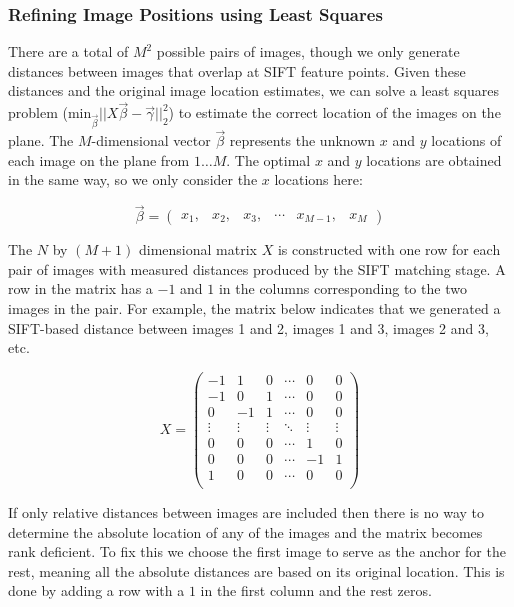 \documentclass[10pt,twocolumn,letterpaper]{article}
\begin{document}
\subsubsection{Refining Image Positions using Least Squares}
\label{sec:refiningImagePositions}
There are a total of $M^{2}$ possible pairs of images, though we only
generate distances between images that overlap at SIFT feature
points. Given these distances and the original image location
estimates, we can solve a least squares problem
($\textrm{min}_{\vec{\beta}} ||X \vec{\beta} - \vec{\gamma}||_2^2 $)
to estimate the correct location of the images on the plane. The
$M$-dimensional vector $\vec{\beta}$ represents the unknown $x$ and
$y$ locations of each image on the plane from $1 \dots M$. The optimal
$x$ and $y$ locations are obtained in the same way, so we only
consider the $x$ locations here:

\[\vec{\beta} =
\begin{pmatrix}
  x_1, & x_2, & x_3, & \cdots & x_{M-1}, & x_M
\end{pmatrix}
\]

The $N$ by $(M+1)$ dimensional matrix $X$ is constructed with one row
for each pair of images with measured distances produced by the SIFT
matching stage. A row in the matrix has a $-1$ and $1$ in the columns
corresponding to the two images in the pair. For example, the matrix
below indicates that we generated a SIFT-based distance between images
1 and 2, images 1 and 3, images 2 and 3, etc.

\[
X =
\begin{pmatrix}
  -1 & 1 & 0 & \cdots & 0 & 0\\
  -1 & 0 & 1 & \cdots & 0 & 0\\
  0 & -1 & 1 & \cdots & 0 & 0\\
  \vdots  & \vdots & \vdots & \ddots & \vdots  & \vdots\\
  0 & 0 & 0 & \cdots & 1 & 0 \\
  0 & 0 & 0 & \cdots & -1 & 1 \\
  1 & 0 & 0 & \cdots & 0 & 0 \\
\end{pmatrix}
\]

If only relative distances between images are included then there is
no way to determine the absolute location of any of the images and the
matrix becomes rank deficient. To fix this we choose the first image
to serve as the anchor for the rest, meaning all the absolute
distances are based on its original location. This is done by adding a
row with a $1$ in the first column and the rest zeros.
\end{document}
